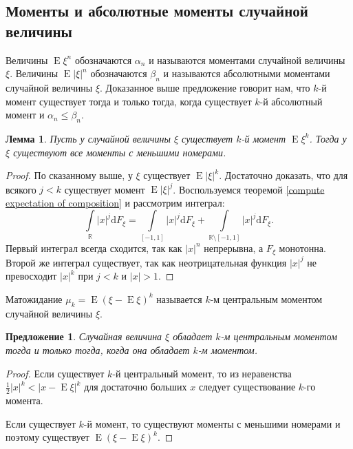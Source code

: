 \documentclass[12pt]{article}
\newtheorem{proposition}[theorem]{Предложение}
\newtheorem{lemma}[theorem]{Лемма}
\numberwithin{theorem}{section}
\theoremstyle{definition}
\newcommand{\defin}[2]{\hypertarget{#2}{{\color{red} #1}}}
\newcommand{\RR}{\mathbb{R}}
\newcommand{\expect}{\operatorname{E}}
\newcommand{\diff}{\mathrm{d}}
\begin{document}
	\subsection{Моменты и абсолютные моменты случайной величины}
	
	Величины $ \expect\xi^n $ обозначаются $ \alpha_n $ и называются \defin{моментами случайной величины $ \xi $}{moment}.
	Величины $ \expect|\xi|^n $ обозначаются $ \beta_n $ и называются \defin{абсолютными моментами случайной величины $ \xi $}{absolute-moment}.
	Доказанное выше предложение говорит нам, что $ k $-й момент существует тогда и только тогда,
	когда существует $ k $-й абсолютный момент и $ \alpha_n \leqslant \beta_n $.
	
	\begin{lemma}
		Пусть у случайной величины $ \xi $ существует $ k $-й момент $ \expect\xi^k $.
		Тогда у $ \xi $ существуют все моменты с меньшими номерами.
	\end{lemma}
	
	\begin{proof}
		По сказанному выше, у $ \xi $ существует $ \expect|\xi|^k $.
		Достаточно доказать, что для всякого $ j < k $ существует момент $ \expect|\xi|^j $.
		Воспользуемся теоремой \ref{compute expectation of composition}
		и рассмотрим интеграл:
		$$ \int\limits_{\RR} |x|^j\diff F_\xi = \int\limits_{[-1, 1]} |x|^j\diff F_\xi
		+ \int\limits_{\RR \setminus [-1, 1]} |x|^j\diff F_\xi. $$
		Первый интеграл всегда сходится, так как $ |x|^n $ непрерывна, а $ F_\xi $ монотонна.
		Второй же интеграл существует, так как неотрицательная функция $ |x|^j $ не превосходит $ |x|^k $
		при $ j < k $ и $ |x| > 1 $.
	\end{proof}


	Матожидание $ \mu_k = \expect(\xi - \expect\xi)^k $ называется 
	\defin{$ k $-м центральным моментом случайной величины $ \xi $}{central-moment}.
	
	\begin{proposition}
		Случайная величина $ \xi $ обладает $ k $-м центральным моментом
		тогда и только тогда, когда она обладает $ k $-м моментом.
	\end{proposition}
	
	\begin{proof}
		Если существует $ k $-й центральный момент, то из неравенства $ \tfrac{1}{2}|x|^k < |x - \expect\xi|^k $
		для достаточно больших $ x $ следует существование $ k $-го момента.
		
		Если существует $ k $-й момент, то существуют моменты с меньшими номерами
		и поэтому существует $ \expect(\xi - \expect\xi)^k $.
	\end{proof}
\end{document}
